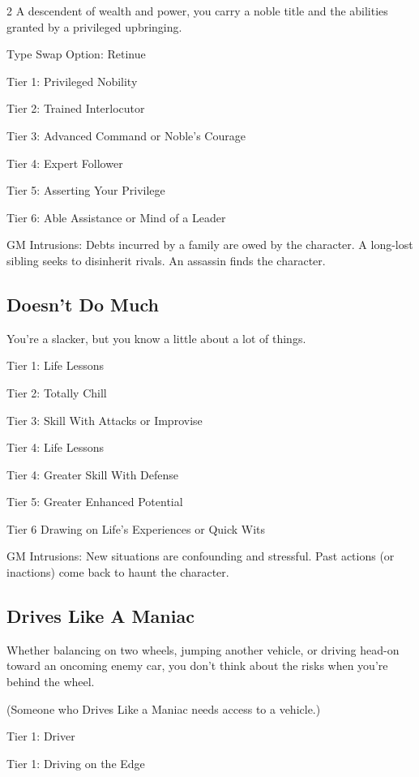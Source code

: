 \begin{multicols}{2}
A descendent of wealth and power, you carry a noble title and the abilities granted by a privileged upbringing.

Type Swap Option: Retinue

Tier 1: Privileged Nobility

Tier 2: Trained Interlocutor

Tier 3: Advanced Command or Noble’s Courage

Tier 4: Expert Follower

Tier 5: Asserting Your Privilege

Tier 6: Able Assistance or Mind of a Leader

GM Intrusions: Debts incurred by a family are owed by the character. A long-lost sibling seeks to disinherit rivals. An assassin finds the character.

\subsection{Doesn’t Do Much}

You’re a slacker, but you know a little about a lot of things.

Tier 1: Life Lessons

Tier 2: Totally Chill

Tier 3: Skill With Attacks or Improvise

Tier 4: Life Lessons

Tier 4: Greater Skill With Defense

Tier 5: Greater Enhanced Potential

Tier 6 Drawing on Life’s Experiences or Quick Wits

GM Intrusions: New situations are confounding and stressful. Past actions (or inactions) come back to haunt the character.

\subsection{Drives Like A Maniac}

Whether balancing on two wheels, jumping another vehicle, or driving head-on toward an oncoming enemy car, you don’t think about the risks when you’re behind the wheel.

(Someone who Drives Like a Maniac needs access to a vehicle.)

Tier 1: Driver

Tier 1: Driving on the Edge


\end{multicols}
